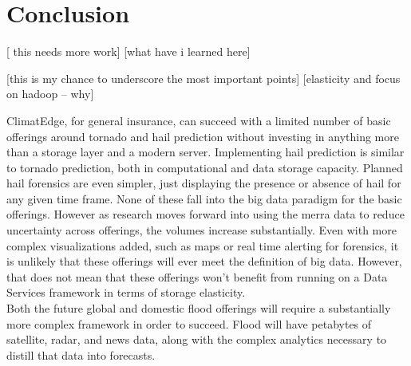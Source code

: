 \section{Conclusion}
[ this needs more work]
[what have i learned here]

[this is my chance to underscore the most important points]
[elasticity and focus on hadoop -- why]

ClimatEdge\texttrademark{}, for general insurance, can succeed with a limited number of basic offerings around tornado and hail prediction without investing in anything more than a storage layer and a modern server. Implementing hail prediction is similar to tornado prediction, both in computational and data storage capacity. Planned hail forensics are even simpler, just displaying the presence or absence of hail for any given time frame. None of these fall into the big data paradigm for the basic offerings. However as research moves forward into using the \gls{merra} data to reduce uncertainty across offerings, the volumes increase substantially. Even with more complex visualizations added, such as maps or real time alerting for forensics, it is unlikely that these offerings will ever meet the definition of big data. However, that does not mean that these offerings won't benefit from running on a Data Services framework in terms of storage elasticity. \\

Both the future global and domestic flood offerings will require a substantially more complex framework in order to succeed. Flood will have petabytes of satellite, radar, and news data, along with the complex analytics necessary to distill that data into forecasts.  